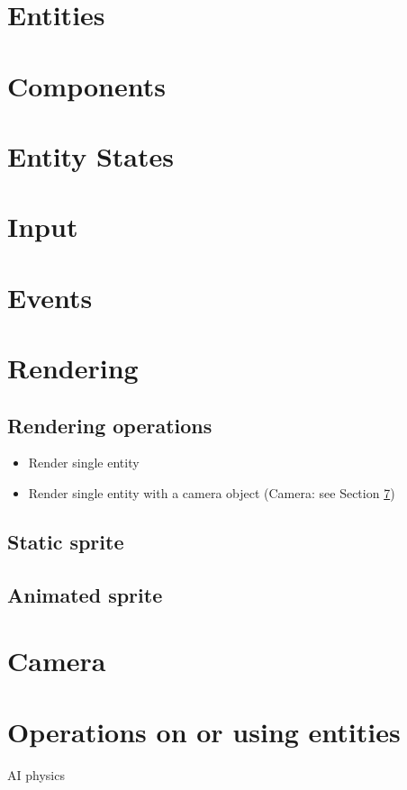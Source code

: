 \documentclass[12pt]{article}
\begin{document}
\section{	Entities}

\section{	Components}

\section{	Entity States}

\section{	Input}

\section{	Events}

\section{	Rendering}
\subsection{Rendering operations}
\begin{itemize}
	\item Render single entity
	\item Render single entity with a camera object (Camera: see Section \ref{sec:Camera})
\end{itemize}
\subsection{Static sprite}
\subsection{Animated sprite}


\section{ Camera} \label{sec:Camera}

\section{	Operations on or using entities}
		AI
		physics
\end{document}
